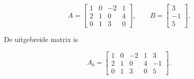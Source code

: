 \documentclass{ximera}
\begin{document}
\begin{oefening}{\oefB\ESS}
\begin{question}
\begin{oplossing}
\[
A=
\begin{bmatrix}
1&0&-2&1\\
2&1&0&4\\
0&1&3&0
\end{bmatrix},
\qquad
B=
\begin{bmatrix}
3\\-1\\5
\end{bmatrix}.
\]

De uitgebreide matrix is

\[
A_b=
\left[
\begin{array}{cccc|c}
1&0&-2&1&3\\
2&1&0&4&-1\\
0&1&3&0&5
\end{array}
\right].
\]

\end{oplossing}

\end{question}

\end{oefening}



\end{document}
